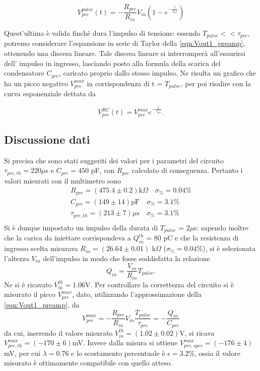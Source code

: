 \documentclass{article}
\begin{document}
\begin{equation}
    \label{eqn:Vout1_preamp}
    V_{pre}^{pulse}(t) = -\frac{R_{pre}}{R_{in}}V_{in}(1-e^{-\frac{t}{\tau_{pre}}})
\end{equation}

Quest'ultima è valida finché dura l'impulso di tensione: essendo $T_{pulse} << \tau_{pre}$, potremo considerare l'espansione in 
serie di Taylor della \ref{eqn:Vout1_preamp}, ottenendo una discesa lineare. Tale discesa lineare si interromperà all'esaurirsi dell'
impulso in ingresso, lasciando posto alla formula della scarica del condensatore $C_{pre}$, caricato proprio dallo stesso impulso.
Ne risulta un grafico che ha un picco negativo $V_{pre}^{max}$ in corrispondenza di t = $T_{pulse}$, per poi risalire con la curva esponenziale
dettata da

\begin{equation}
    \label{eqn:Vout2_preamp}
    V_{pre}^{RC}(t) = V_{pre}^{max}e^{-\frac{t}{\tau_{pre}}}.
\end{equation}

\subsection{Discussione dati}

Si precisa che sono stati suggeriti dei valori per i parametri del circuito $\tau_{pre,th} = 220 \mu$s e $C_{pre} = 450$ pF, con $R_{pre}$ calcolato di 
conseguenza. Pertanto i valori misurati con il multimetro sono
\begin{align*}
    R_{pre} = (475.4 \pm 0.2)\text{k}\Omega \quad \sigma_{\%}=0.04 \% \\    
    C_{pre} = (149 \pm 14) \text{pF} \quad \sigma_{\%}=3.1 \%    \\
    \tau_{pre,th} = (213 \pm 7)\mu \text{s} \quad \sigma_{\%}=3.1 \%     \\
\end{align*}
Si è dunque impostato un impulso della durata di $T_{pulse}$ = $2 \mu$s: sapendo inoltre che la carica da iniettare 
corrispondeva a $Q_{in}^{th}$ = 80 pC e che la resistenza di ingresso scelta misurava $R_{in}=(26.64\pm0.01)$ k$\Omega$ ($\sigma_{\%}=0.04\%$), 
si è selezionata l'altezza $V_{in}$ dell'impulso in modo che fosse soddisfatta la relazione
\begin{equation}
    \label{eqn:Qin}
    Q_{in} = \frac{V_{in}}{R_{in}} T_{pulse}.
\end{equation}
Ne si è ricavato $V_{in}^{th} =1.06 $V. Per controllare la correttezza del circuito si è misurato il picco $V_{pre}^{max}$,
dato, utilizzando l'approssimazione della \ref{eqn:Vout1_preamp}, da
\begin{equation}
    \label{eqn:Vpre_max}
    V_{pre}^{max} = -\frac{R_{pre}}{R_{in}} V_{in} \frac{T_{pulse}}{\tau_{pre}} = - \frac{Q_{in}}{C_{pre}}
\end{equation}
da cui, inserendo il valore misurato $V_{in}^{th}=(1.02\pm 0.02) $V, si ricava $V_{pre,th}^{max} =  (-170 \pm 6) $mV. Invece dalla 
misura si ottiene $V_{pre,sper}^{max} = (-176 \pm 4) $mV, per cui $\lambda = 0.76$ e lo scostamento percentuale è $\epsilon = 3.2 \%$, 
ossia il valore misurato è ottimamente compatibile con quello atteso.
\end{document}
